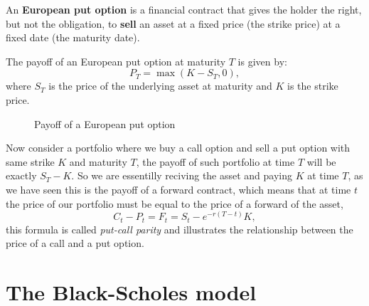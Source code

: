 \begin{definition}
    An \textbf{European put option} is a financial contract that gives the holder the right,
    but not the obligation,
    to \textbf{sell} an asset at a fixed price (the strike price) at a fixed date (the maturity date).

    The payoff of an European put option at maturity $T$ is given by:
    \begin{equation}
        P_T = \max(K - S_T, 0),
    \end{equation}
    where $S_T$ is the price of the underlying asset at maturity and $K$ is the strike price.

    \begin{figure}[h] \label{fig:put_payoff}
        \centering
        \caption{Payoff of a European put option}
    \end{figure}
\end{definition}

Now consider a portfolio where we buy a call option and sell a put option with same strike $K$ and maturity $T$,
the payoff of such portfolio at time $T$ will be exactly $S_T - K$.
So we are essentilly reciving the asset and paying $K$ at time $T$,
as we have seen this is the payoff of a forward contract, which means that at time $t$ the price of our portfolio must be equal to the price of a forward of the asset,
\begin{equation} \label{eq:put_call_parity}
    C_t - P_t = F_t = S_t - e^{-r(T - t)} K,
\end{equation}
this formula is called \textit{put-call parity} and illustrates the relationship between the price of a call and a put option.


\section{The Black-Scholes model}\label{subsec:black_scholes_model}

